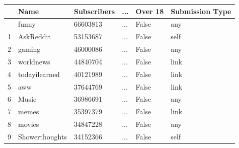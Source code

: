 \documentclass[
  12pt,
  letterpaper,
  DIV=11,
  numbers=noendperiod]{scrartcl}
\begin{document}
\begin{longtable}[]{@{}llllll@{}}
\toprule\noalign{}
& Name & Subscribers & ... & Over 18 & Submission Type \\
\midrule\noalign{}
\endhead
\bottomrule\noalign{}
\endlastfoot
0 & funny & 66603813 & ... & False & any \\
1 & AskReddit & 53153687 & ... & False & self \\
2 & gaming & 46000086 & ... & False & any \\
3 & worldnews & 44840704 & ... & False & link \\
4 & todayilearned & 40121989 & ... & False & link \\
5 & aww & 37644769 & ... & False & link \\
6 & Music & 36986691 & ... & False & any \\
7 & memes & 35397379 & ... & False & link \\
8 & movies & 34847228 & ... & False & any \\
9 & Showerthoughts & 34152366 & ... & False & self \\
\end{longtable}
\end{document}
